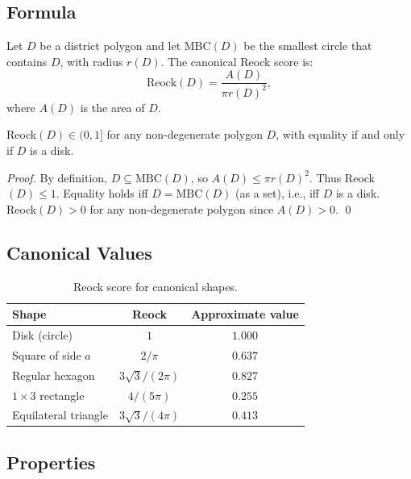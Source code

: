 \subsection{Formula}

Let $D$ be a district polygon and let MBC$(D)$ be the smallest circle that
contains $D$, with radius $r(D)$.
The canonical Reock score is:
\begin{equation}
  \text{Reock}(D) = \frac{A(D)}{\pi r(D)^2},
  \label{eq:reock}
\end{equation}
where $A(D)$ is the area of $D$.

\begin{proposition}
  Reock$(D) \in (0, 1]$ for any non-degenerate polygon $D$,
  with equality if and only if $D$ is a disk.
\end{proposition}

\begin{proof}
  By definition, $D \subseteq \text{MBC}(D)$, so $A(D) \leq \pi r(D)^2$.
  Thus Reock$(D) \leq 1$.
  Equality holds iff $D = \text{MBC}(D)$ (as a set), i.e., iff $D$ is a disk.
  Reock$(D) > 0$ for any non-degenerate polygon since $A(D) > 0$. \qed
\end{proof}

\subsection{Canonical Values}

\begin{table}[ht]
\centering
\caption{Reock score for canonical shapes.}
\label{tab:reock_canonical}
\begin{tabular}{lcc}
\toprule
Shape & Reock & Approximate value \\
\midrule
Disk (circle) & $1$ & $1.000$ \\
Square of side $a$ & $2/\pi$ & $0.637$ \\
Regular hexagon & $3\sqrt{3}/(2\pi)$ & $0.827$ \\
$1 \times 3$ rectangle & $4/(5\pi)$ & $0.255$ \\
Equilateral triangle & $3\sqrt{3}/(4\pi)$ & $0.413$ \\
\bottomrule
\end{tabular}
\end{table}

\subsection{Properties}

